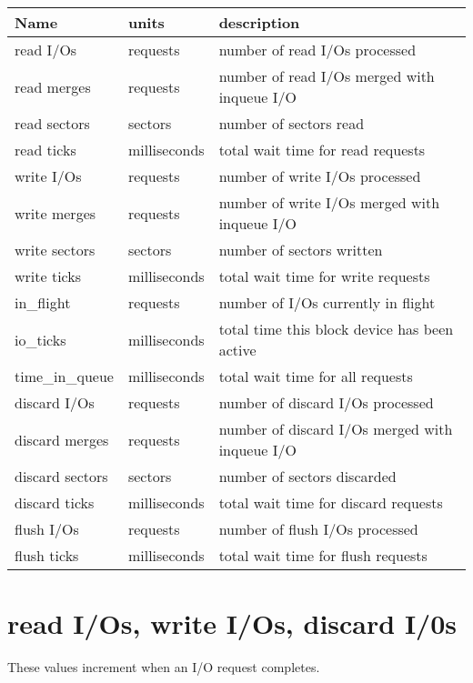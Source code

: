 \documentclass[a4paper,11pt,english]{sphinxmanual}
\begin{document}
\begin{savenotes}\sphinxattablestart
\centering
\begin{tabulary}{\linewidth}[t]{|T|T|T|}
\hline
\sphinxstyletheadfamily 
Name
&\sphinxstyletheadfamily 
units
&\sphinxstyletheadfamily 
description
\\
\hline
read I/Os
&
requests
&
number of read I/Os processed
\\
\hline
read merges
&
requests
&
number of read I/Os merged with in\sphinxhyphen{}queue I/O
\\
\hline
read sectors
&
sectors
&
number of sectors read
\\
\hline
read ticks
&
milliseconds
&
total wait time for read requests
\\
\hline
write I/Os
&
requests
&
number of write I/Os processed
\\
\hline
write merges
&
requests
&
number of write I/Os merged with in\sphinxhyphen{}queue I/O
\\
\hline
write sectors
&
sectors
&
number of sectors written
\\
\hline
write ticks
&
milliseconds
&
total wait time for write requests
\\
\hline
in\_flight
&
requests
&
number of I/Os currently in flight
\\
\hline
io\_ticks
&
milliseconds
&
total time this block device has been active
\\
\hline
time\_in\_queue
&
milliseconds
&
total wait time for all requests
\\
\hline
discard I/Os
&
requests
&
number of discard I/Os processed
\\
\hline
discard merges
&
requests
&
number of discard I/Os merged with in\sphinxhyphen{}queue I/O
\\
\hline
discard sectors
&
sectors
&
number of sectors discarded
\\
\hline
discard ticks
&
milliseconds
&
total wait time for discard requests
\\
\hline
flush I/Os
&
requests
&
number of flush I/Os processed
\\
\hline
flush ticks
&
milliseconds
&
total wait time for flush requests
\\
\hline
\end{tabulary}
\par
\sphinxattableend\end{savenotes}


\section{read I/Os, write I/Os, discard I/0s}
\label{\detokenize{stat:read-i-os-write-i-os-discard-i-0s}}
These values increment when an I/O request completes.
\end{document}

